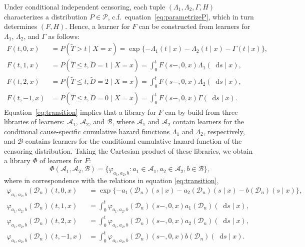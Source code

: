 \documentclass[alpha-refs]{wiley-article}
\renewcommand{\phi}{\varphi}
\newcommand*\diff{\mathop{}\!\mathrm{d}}
\newcommand{\1}{\mathbb{1}}
\newcommand{\data}{\ensuremath{\mathcal{D}}}
\begin{document}
Under conditional independent censoring, each tuple
$(\Lambda_{1}, \Lambda_{2}, \Gamma, H)$ characterizes a distribution
\(P\in\mathcal P\), c.f.\ equation~\eqref{eq:parametrizeP}, which in
turn determines \( (F, H) \). Hence, a learner for \( F \) can be
constructed from learners for \( \Lambda_1 \), \( \Lambda_2 \), and
$\Gamma$ as follows:
\begin{equation}\label{eq:transition}
  \begin{split}
    F(t, 0, x)
    &
      = P(\tilde{T} > t \mid X= x)
      =
      \exp{{\{-\Lambda_{1}(t \mid x)-\Lambda_{2}(t \mid x) - \Gamma(t \mid x)\}
      }},
    \\
    F(t, 1, x)
    &
      = P(\tilde{T} \leq t, \tilde{D}=1 \mid X=x)
      = \int_0^t F(s-, 0, x)  \Lambda_{1}(\diff s \mid x),
    \\
    F(t, 2, x)
    &
      = P(\tilde{T} \leq t, \tilde{D}=2 \mid X=x)
      = \int_0^t  F(s-, 0, x)  \Lambda_{2}(\diff s \mid x),
    \\
    F(t, -1, x)
    &
      = P(\tilde{T} \leq t, \tilde{D}=0 \mid X=x)
      = \int_0^t F(s-, 0, x)  \Gamma(\diff s \mid x).
  \end{split}
\end{equation}
Equation~\eqref{eq:transition} implies that a library for \( F \) can
by build from three libraries of learners: \(\mathcal{A}_1\),
\( \mathcal{A}_2 \), and \( \mathcal{B} \), where \(\mathcal{A}_1\)
and \( \mathcal{A}_2\) contain learners for the conditional
cause-specific cumulative hazard functions \(\Lambda_1\) and
\( \Lambda_2\), respectively, and \(\mathcal{B}\) contains learners
for the conditional cumulative hazard function of the censoring
distribution.  Taking the Cartesian product of these libraries, we
obtain a library $\Phi$ of learners for \( F \):
\begin{equation}
  \label{eq:jssl-lib-def}
  \Phi(\mathcal{A}_1, \mathcal{A}_2, \mathcal{B})
  = \{ \phi_{a_1,a_2, b} : a_1 \in \mathcal{A}_1, a_2 \in \mathcal{A}_2, b \in \mathcal{B}\},
\end{equation}
where in correspondence with the relations in equation
\eqref{eq:transition},
\begin{equation}
  \begin{split}\label{eq:anti-transition}
    \phi_{a_1,a_2, b}(\data_n)(t,0,x)
  &= \exp{\{-a_1(\data_n)(s \mid x)-a_2(\data_n)(s \mid x) - b(\data_n)(s \mid
    x)\} },
  \\
  \phi_{a_1,a_2, b}(\data_n)(t,1,x)
  &= \int_0^t
    \phi_{a_1,a_2, b}(\data_n)(s-,0,x)  a_1(\data_n)(\diff s \mid x),
  \\
  \phi_{a_1,a_2, b}(\data_n)(t,2,x)
  &= \int_0^t\phi_{a_1,a_2, b}(\data_n)(s-,0,x)  a_2(\data_n)(\diff s \mid x),
  \\
  \phi_{a_1,a_2, b}(\data_n)(t,-1,x)
  &= \int_0^t \phi_{a_1,a_2, b}(\data_n)(s-,0,x)  b(\data_n)(\diff s \mid x).
  \end{split}
\end{equation}
\end{document}
